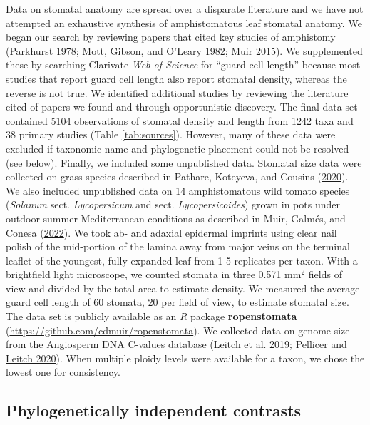 \documentclass[
  12pt,
]{article}
\begin{document}
Data on stomatal anatomy are spread over a disparate literature and we have not attempted an exhaustive synthesis of amphistomatous leaf stomatal anatomy. We began our search by reviewing papers that cited key studies of amphistomy (\protect\hyperlink{ref-parkhurst_adaptive_1978}{Parkhurst 1978}; \protect\hyperlink{ref-mott_adaptive_1982}{Mott, Gibson, and O'Leary 1982}; \protect\hyperlink{ref-muir_making_2015}{Muir 2015}). We supplemented these by searching Clarivate \emph{Web of Science} for ``guard cell length'' because most studies that report guard cell length also report stomatal density, whereas the reverse is not true. We identified additional studies by reviewing the literature cited of papers we found and through opportunistic discovery. The final data set contained 5104 observations of stomatal density and length from 1242 taxa and 38 primary studies (Table \ref{tab:sources}). However, many of these data were excluded if taxonomic name and phylogenetic placement could not be resolved (see below). Finally, we included some unpublished data. Stomatal size data were collected on grass species described in Pathare, Koteyeva, and Cousins (\protect\hyperlink{ref-pathare_increased_2020}{2020}). We also included unpublished data on 14 amphistomatous wild tomato species (\emph{Solanum} sect. \emph{Lycopersicum} and sect. \emph{Lycopersicoides}) grown in pots under outdoor summer Mediterranean conditions as described in Muir, Galmés, and Conesa (\protect\hyperlink{ref-muir_unpublished_2022}{2022}). We took ab- and adaxial epidermal imprints using clear nail polish of the mid-portion of the lamina away from major veins on the terminal leaflet of the youngest, fully expanded leaf from 1-5 replicates per taxon. With a brightfield light microscope, we counted stomata in three 0.571 mm\(^2\) fields of view and divided by the total area to estimate density. We measured the average guard cell length of 60 stomata, 20 per field of view, to estimate stomatal size. The data set is publicly available as an \emph{R} package \textbf{ropenstomata} (\url{https://github.com/cdmuir/ropenstomata}). We collected data on genome size from the Angiosperm DNA C-values database (\protect\hyperlink{ref-leitch_angiosperm_2019}{Leitch et al. 2019}; \protect\hyperlink{ref-pellicer_plant_2020}{Pellicer and Leitch 2020}). When multiple ploidy levels were available for a taxon, we chose the lowest one for consistency.

\hypertarget{phylogenetically-independent-contrasts}{%
\subsection{Phylogenetically independent contrasts}\label{phylogenetically-independent-contrasts}}
\end{document}
